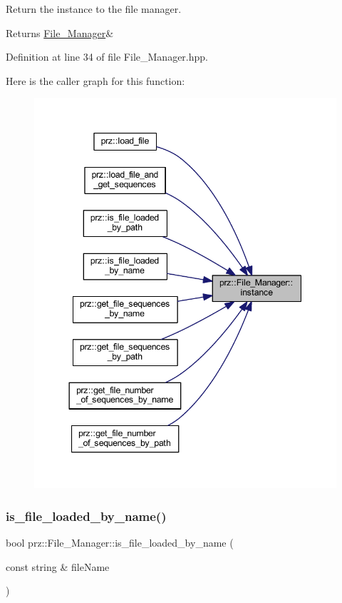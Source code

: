 Return the instance to the file manager. 

\begin{DoxyReturn}{Returns}
\mbox{\hyperlink{classprz_1_1_file___manager}{File\+\_\+\+Manager}}\& 
\end{DoxyReturn}


Definition at line 34 of file File\+\_\+\+Manager.\+hpp.

Here is the caller graph for this function\+:
\nopagebreak
\begin{figure}[H]
\begin{center}
\leavevmode
\includegraphics[width=344pt]{classprz_1_1_file___manager_a01f8e98b44d904709af8ec7f9bf91f3a_icgraph}
\end{center}
\end{figure}
\mbox{\label{classprz_1_1_file___manager_a57fba84490a328ce3b244198272be7f4}} 
\subsubsection{\texorpdfstring{is\_file\_loaded\_by\_name()}{is\_file\_loaded\_by\_name()}}
{\footnotesize\ttfamily bool prz\+::\+File\+\_\+\+Manager\+::is\+\_\+file\+\_\+loaded\+\_\+by\+\_\+name (\begin{DoxyParamCaption}\item[{const string \&}]{file\+Name }\end{DoxyParamCaption})}



